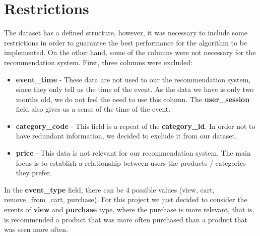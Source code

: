 \section{Restrictions}
\label{restrictions}

The dataset has a defined structure, however, it was necessary to include some restrictions in order to guarantee the best performance for the algorithm to be implemented.
On the other hand, some of the columns were not necessary for the recommendation system.
First, three columns were excluded:
\begin{itemize}
    \item \textbf{event\_time} - These data are not used to our the recommendation system, since they only tell us the time of the event.
    As the data we have is only two months old, we do not feel the need to use this column.
    The \textbf{user\_session} field also gives us a sense of the time of the event.
    \item \textbf{category\_code} - This field is a repeat of the \textbf{category\_id}.
    In order not to have redundant information, we decided to exclude it from our dataset.
    \item \textbf{price} - This data is not relevant for our recommendation system.
    The main focus is to establish a relationship between users the products / categories they prefer.
\end{itemize}

In the \textbf{event\_type} field, there can be 4 possible values (view, cart, remove\_from\_cart, purchase).
For this project we just decided to consider the events of \textbf{view} and \textbf{purchase} type, where the purchase is more relevant, that is, is recommended a product that was more often purchased than a product that was seen more often.



